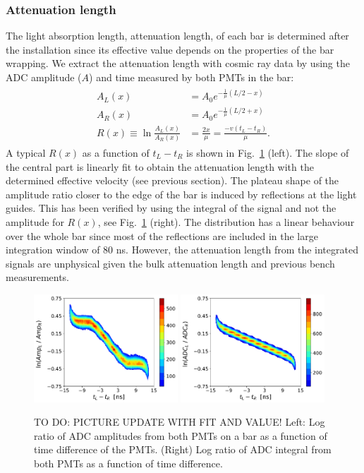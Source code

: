 \documentclass[3p,final,twocolumn]{elsarticle}
\begin{document}
\subsubsection{Attenuation length}
The light absorption length, attenuation length, of each bar is determined after the installation since its effective value depends on the properties of the bar wrapping.
We extract the attenuation length with cosmic ray data by using the 
ADC amplitude ($A$) and time measured by both PMTs in the bar:
\begin{eqnarray}
	\begin{split}
		A_L(x) &= A_0 e^{-\frac{1}{\mu}\left(L/2-x\right) }				\\
		A_R(x) &= A_0 e^{-\frac{1}{\mu}\left(L/2+x\right) }				\\
		R(x) \equiv \ln{\frac{A_L(x)}{A_R(x)}} &= \frac{2x}{\mu} = \frac{-v(t_{L}-t_{R})}{\mu}.			
		 \label{eqn:atten}
	\end{split}
\end{eqnarray}
A typical $R(x)$ as a function of $t_{L}-t_{R}$ is shown in Fig.~\ref{fig:atten} (left). 
The slope of the central part is linearly fit to obtain the attenuation length with the determined effective velocity (see previous section).
The plateau shape of the amplitude ratio closer to the edge of the bar is induced by reflections at the light guides. This has been verified by
using the integral of the signal and not the amplitude for $R(x)$, see Fig.~\ref{fig:atten} (right). The distribution has a linear behaviour over the whole bar since most of the reflections are included in the large integration window of 80 \si{\nano\s}. However, the attenuation length from the integrated signals are unphysical given the bulk attenuation length and previous bench measurements. 

\begin{figure}[tb]
	\centering
		\includegraphics[width=0.48\textwidth]{atten-amp.pdf}
		\includegraphics[width=0.48\textwidth]{atten-adc.pdf}
	\caption{TO DO: PICTURE UPDATE WITH FIT AND VALUE! Left: Log ratio of ADC amplitudes from both PMTs on a bar as a function of time difference of the PMTs. (Right) Log ratio of ADC integral from both PMTs as a function of time difference.}
	\label{fig:atten}
\end{figure}
\end{document}
